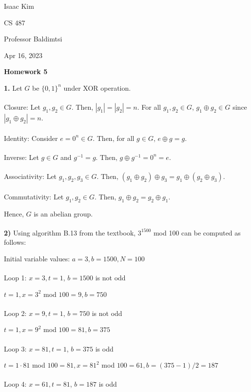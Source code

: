 \documentclass[12pt]{article}
\begin{document}
\noindent Isaac Kim

\noindent CS 487

\noindent Professor Baldimtsi

\noindent Apr 16, 2023

\begin{center} 
\textbf{Homework 5}
\end{center}

\noindent \textbf{1.} Let $G$ be $\{0,1\}^n$ under XOR operation.
\\
\\
\noindent Closure: Let $g_1, g_2 \in G$. Then, $|g_1| =  |g_2| = n$. For all $g_1, g_2 \in G$, $g_1 \oplus g_2 \in G$ since $|g_1 \oplus g_2| = n$.
\\
\\
\noindent Identity: Consider $e  = 0^n \in G$. Then, for all $g \in G$, $e \oplus g = g$.
\\
\\
\noindent Inverse: Let $g \in G$ and $g^{-1} = g$. Then, $g \oplus g^{-1} = 0^n = e$.
\\
\\
\noindent Associativity: Let $g_1, g_2, g_3 \in G$. Then, $(g_1 \oplus g_2) \oplus g_3 = g_1 \oplus (g_2 \oplus g_3)$.
\\
\\
\noindent Commutativity: Let $g_1, g_2 \in G$. Then, $g_1 \oplus g_2 = g_2 \oplus g_1$.

\noindent Hence, $G$ is an abelian group.
\\
\\
\noindent \textbf{2)} Using algorithm B.13 from the textbook, $3^{1500}$ mod 100 can be computed as follows:

\noindent Initial variable values: $a = 3, b = 1500, N = 100$
\\
\\
\noindent Loop 1: $x = 3, t = 1$, $b = 1500$ is not odd

$t=1, x = 3^2$ mod $100 = 9, b = 750$
\\
\\
\noindent Loop 2: $x = 9, t = 1$, $b = 750$ is not odd

$t=1, x = 9^2$ mod $100 = 81, b = 375$
\\
\\
\noindent Loop 3: $x = 81, t = 1$, $b = 375$ is odd

$t = 1 \cdot 81$ mod $100 = 81, x = 81^2$ mod $100 = 61, b = (375-1)/2 = 187$
\\
\\
\noindent Loop 4: $x = 61, t = 81$, $b = 187$ is odd
\end{document}

